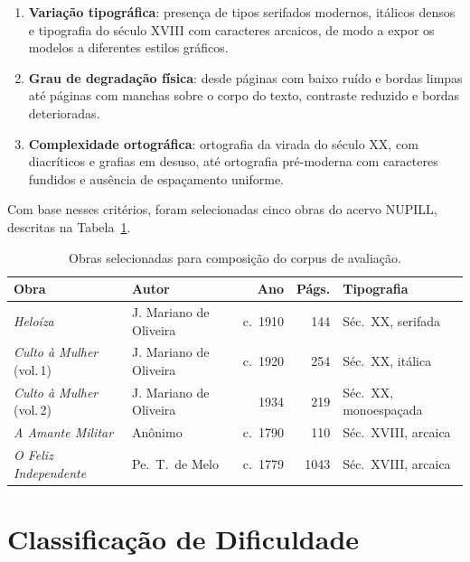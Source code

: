 \documentclass[
  12pt,
  oneside,
  a4paper,
  chapter=TITLE,
  section=TITLE,
  english,
  brazil
]{abntex2}
\begin{document}
\begin{enumerate}
    \item \textbf{Variação tipográfica}: presença de tipos serifados modernos, itálicos
    densos e tipografia do século XVIII com caracteres arcaicos, de modo a expor os
    modelos a diferentes estilos gráficos.

    \item \textbf{Grau de degradação física}: desde páginas com baixo ruído e bordas
    limpas até páginas com manchas sobre o corpo do texto, contraste reduzido e bordas
    deterioradas.

    \item \textbf{Complexidade ortográfica}: ortografia da virada do século XX, com
    diacríticos e grafias em desuso, até ortografia pré-moderna com caracteres fundidos
    e ausência de espaçamento uniforme.
\end{enumerate}

Com base nesses critérios, foram selecionadas cinco obras do acervo NUPILL, descritas na
Tabela~\ref{tab:obras_corpus}.

\begin{table}[H]
\centering
\caption{Obras selecionadas para composição do corpus de avaliação.}
\label{tab:obras_corpus}
\renewcommand{\arraystretch}{1.3}
\begin{tabular}{p{4.5cm} p{3.5cm} r r p{3.2cm}}
\hline \hline
\textbf{Obra} & \textbf{Autor} & \textbf{Ano} & \textbf{Págs.} & \textbf{Tipografia} \\
\hline \hline
\textit{Heloíza}
  & J. Mariano de Oliveira & c.\ 1910 & 144  & Séc.\ XX, serifada \\ \hline
\textit{Culto à Mulher} (vol.\,1)
  & J. Mariano de Oliveira & c.\ 1920 & 254  & Séc.\ XX, itálica \\ \hline
\textit{Culto à Mulher} (vol.\,2)
  & J. Mariano de Oliveira & 1934     & 219  & Séc.\ XX, monoespaçada \\ \hline
\textit{A Amante Militar}
  & Anônimo                & c.\ 1790 & 110  & Séc.\ XVIII, arcaica \\ \hline
\textit{O Feliz Independente}
  & Pe.\ T.\ de Melo       & c.\ 1779 & 1043 & Séc.\ XVIII, arcaica \\
\hline \hline
\end{tabular}
\end{table}

\section{Classificação de Dificuldade}
\end{document}
